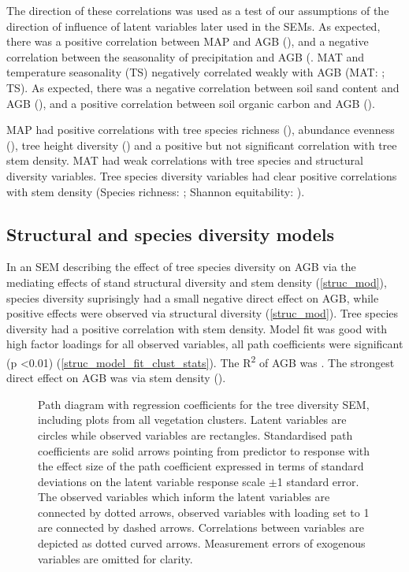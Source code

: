 \documentclass[11pt,a4paper]{article}
\begin{document}
The direction of these correlations was used as a test of our assumptions of the direction of influence of latent variables later used in the SEMs. As expected, there was a positive correlation between MAP and AGB (\ccmb{}), and a negative correlation between the seasonality of precipitation and AGB (\ccmcb{}. MAT and temperature seasonality (TS) negatively correlated weakly with AGB (MAT: \cctb{}; TS\cctcb{}). As expected, there was a negative correlation between soil sand content and AGB (\ccsb{}), and a positive correlation between soil organic carbon and AGB (\ccob{}). 

MAP had positive correlations with tree species richness (\ccms{}), abundance evenness (\ccme{}), tree height diversity (\ccmh{}) and a positive but not significant correlation with tree stem density. MAT had weak correlations with tree species and structural diversity variables. Tree species diversity variables had clear positive correlations with stem density (Species richness: \ccsi{}; Shannon equitability: \ccei{}). 

\subsection{Structural and species diversity models}

In an SEM describing the effect of tree species diversity on AGB via the mediating effects of stand structural diversity and stem density (\autoref{struc_mod}), species diversity suprisingly had a small negative direct effect on AGB, while positive effects were observed via structural diversity (\autoref{struc_mod}). Tree species diversity had a positive correlation with stem density. Model fit was good with high factor loadings for all observed variables, all path coefficients were significant (p <0.01) (\autoref{struc_model_fit_clust_stats}). The R\textsuperscript{2} of AGB was \strucrsq{}. The strongest direct effect on AGB was via stem density (\strucsib{}).

\begin{figure}[H]
\centering
	
	\caption{Path diagram with regression coefficients for the tree diversity SEM, including plots from all vegetation clusters. Latent variables are circles while observed variables are rectangles. Standardised path coefficients are solid arrows pointing from predictor to response with the effect size of the path coefficient expressed in terms of standard deviations on the latent variable response scale $\pm$1 standard error. The observed variables which inform the latent variables are connected by dotted arrows, observed variables with loading set to 1 are connected by dashed arrows. Correlations between variables are depicted as dotted curved arrows. Measurement errors of exogenous variables are omitted for clarity.}
	\label{struc_mod}
\end{figure}
\end{document}
